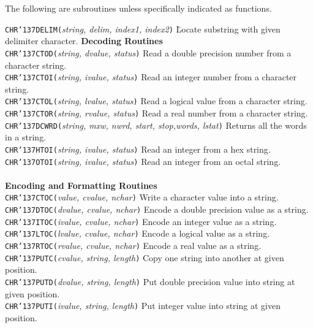 \documentclass[twoside,11pt]{article}
\renewcommand{\_}{{\tt\char'137}}
\begin{document}
The following are subroutines unless specifically indicated as functions.
\begin{tabbing}
 {{\tt{CHR\_DELIM(}}{\em string, delim, index1, index2}{\tt )}} \=
 Locate substring with given delimiter character.\kill
{\bf Decoding Routines}\\
 {{\tt{CHR\_CTOD(}}{\em string, dvalue, status}{\tt )}}  \>
 Read a double precision number from a character string.\\
 {{\tt{CHR\_CTOI(}}{\em string, ivalue, status}{\tt )}}\>
 Read an integer number from a character string.\\
 {{\tt{CHR\_CTOL(}}{\em string, lvalue, status}{\tt )}}\>
 Read a logical value from a character string.\\
 {{\tt{CHR\_CTOR(}}{\em string, rvalue, status}{\tt )}}\>
 Read a real number from a character string.\\
 {{\tt{CHR\_DCWRD(}}{\em string, mxw, nwrd, start, stop,words, lstat}{\tt )}}
 Returns all the words in a string.\\
 {{\tt{CHR\_HTOI(}}{\em string, ivalue, status}{\tt )}}\>
 Read an integer from a hex string.\\
 {{\tt{CHR\_OTOI(}}{\em string, ivalue, status}{\tt )}}\>
 Read an integer from an octal string.\\
\\
{\bf Encoding and Formatting Routines}\\
 {{\tt{CHR\_CTOC(}}{\em value, cvalue, nchar}{\tt )}}\>
 Write a character value into a string.\\
 {{\tt{CHR\_DTOC(}}{\em dvalue, cvalue, nchar}{\tt )}}\>
 Encode a double precision value as a string.\\
 {{\tt{CHR\_ITOC(}}{\em ivalue, cvalue, nchar}{\tt )}}\>
 Encode an integer value as a string.\\
 {{\tt{CHR\_LTOC(}}{\em lvalue, cvalue, nchar}{\tt )}}\>
 Encode a logical value as a string.\\
 {{\tt{CHR\_RTOC(}}{\em rvalue, cvalue, nchar}{\tt )}}\>
 Encode a real value as a string.\\
 {{\tt{CHR\_PUTC(}}{\em cvalue, string, length}{\tt )}}\>
 Copy one string into another at given position.\\
 {{\tt{CHR\_PUTD(}}{\em dvalue, string, length}{\tt )}}\>
 Put double precision value into string at given position.\\
 {{\tt{CHR\_PUTI(}}{\em ivalue, string, length}{\tt )}}\>
 Put integer value into string at given position.\\

\end{tabbing}
\end{document}
